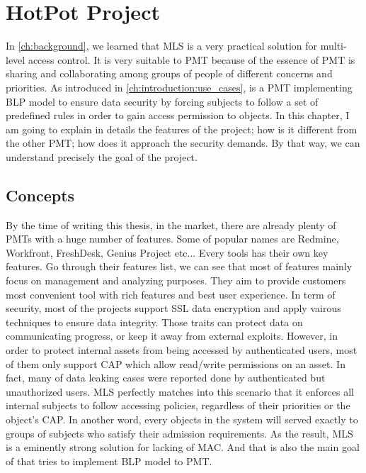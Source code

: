 
\chapter{HotPot Project} %

\label{ch:hopot_project} %


In \autoref{ch:background}, we learned that MLS is a very practical solution for multi-level access control.
It is very suitable to PMT because of the essence of PMT is sharing and collaborating among groups of people of different concerns and priorities.
As introduced in \autoref{ch:introduction:use_cases}, \myProject is a PMT implementing BLP model to ensure data security by forcing subjects to follow a set of predefined rules in order to gain access permission to objects.
In this chapter, I am going to explain in details the features of the project; how is it different from the other PMT; how does it approach the security demands.
By that way, we can understand precisely the goal of the project.


\section{Concepts}
\label{ch:hopot_project:concepts}

By the time of writing this thesis, in the market, there are already plenty of PMTs with a huge number of features.
Some of popular names are Redmine, Workfront, FreshDesk, Genius Project etc...
Every tools has their own key features.
Go through their features list, we can see that most of features mainly focus on management and analyzing purposes.
They aim to provide customers most convenient tool with rich features and best user experience.
In term of security, most of the projects support SSL data encryption and apply vairous techniques to ensure data integrity.
Those traits can protect data on communicating progress, or keep it away from external exploits.
However, in order to protect internal assets from being accessed by authenticated users, most of them only support CAP which allow read/write permissions on an asset.
In fact, many of data leaking cases were reported done by authenticated but unauthorized users.
MLS perfectly matches into this scenario that it enforces all internal subjects to follow accessing policies, regardless of their priorities or the object's CAP.
In another word, every objects in the system will served exactly to groups of subjects who satisfy their admission requirements.
As the result, MLS is a eminently strong solution for lacking of MAC.
And that is also the main goal of \myProject that tries to implement BLP model to PMT.

